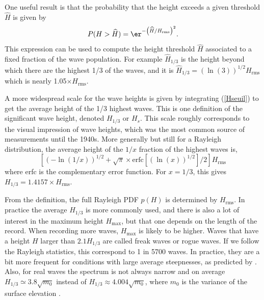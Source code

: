
One useful result is that the probability that the height exceeds a given threshold $\widehat{H}$ 
is given by 
 \begin{equation}
P(H
>\widehat{H})=\er^{-\left(\widehat{H}/H_{\mathrm{rms}}\right)^2}\label{Hseuil}.
\end{equation}
This expression can be used to compute the height threshold $\widehat{H}$
associated to a fixed fraction of the wave population. For example 
$\widehat{H}_{1/3}$ is the height beyond which there are the highest 1/3 of the waves, and it is 
 $\widehat{H}_{1/3}=\left(\ln(3)\right)^{1/2}
H_{\mathrm{rms}}$ which is nearly 1.05$\times H_{\mathrm{rms}}$. 

A more widespread scale for the wave heights is given by integrating 
 (\ref{Hseuil}) to get the average height of the 1/3 highest waves. This is one definition of 
the significant wave height, denoted $H_{1/3}$ or $H_s$. This scale roughly corresponds to the visual impression of wave heights, which was the most common source 
of measurements until the 1940s. 
More generally but still for a Rayleigh distribution, the average height of the $1/x$ fraction of the highest waves is, 
\begin{equation}
\left[\left(-\ln(1/x)\right)^{1/2} + \sqrt{\pi} \times
{\mathrm{erfc}}\left[\left(\ln(x)\right)^{1/2}\right]/2\right]
H_{\mathrm{rms}}
\end{equation}
 where erfc is the complementary error function.  For 
$x=1/3$, this gives $H_{1/3}=1.4157 \times H_{\mathrm{rms}}$.

From the definition, the full Rayleigh PDF $p(H)$ is determined by $H_{\mathrm{rms}}$. In practice the average $H_{1/3}$ is more 
commonly used, and there is also a lot of interest in the maximum height $H_{\mathrm{max}}$, but that one depends on the length of the 
record. When recording more waves,  $H_{\mathrm{max}}$ is likely to be higher. Waves that have a height
$H$ larger than $2.1 H_{1/3}$ are called freak waves or rogue waves. If we follow the Rayleigh statistics, 
this correspond to 1 in 5700 waves. In practice, they are a bit more frequent for conditions with large average steepnesses, as 
predicted by \cite{Tayfun1980}. Also, for real waves the spectrum is not always narrow and on average $H_{1/3} \simeq 3.8 \sqrt{m_0}$
instead of $H_{1/3} \approx 4.004 \sqrt{m_0}$, where $m_0$ is the variance of the surface elevation \citep{Goda1985}.

